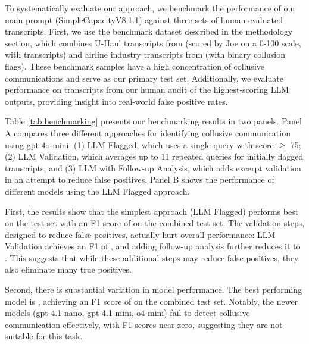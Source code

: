 To systematically evaluate our approach, we benchmark the performance of our main prompt (SimpleCapacityV8.1.1) against three sets of human-evaluated transcripts. First, we use the benchmark dataset described in the methodology section, which combines U-Haul transcripts from \textcite{harrington2022collusion} (scored by Joe on a 0-100 scale, with  transcripts) and airline industry transcripts from \textcite{aryal2022coordinated} (with  binary collusion flags). These benchmark samples have a high concentration of collusive communications and serve as our primary test set. Additionally, we evaluate performance on  transcripts from our human audit of the highest-scoring LLM outputs, providing insight into real-world false positive rates.

Table \ref{tab:benchmarking} presents our benchmarking results in two panels. Panel A compares three different approaches for identifying collusive communication using gpt-4o-mini: (1) LLM Flagged, which uses a single query with score $\geq$ 75; (2) LLM Validation, which averages up to 11 repeated queries for initially flagged transcripts; and (3) LLM with Follow-up Analysis, which adds excerpt validation in an attempt to reduce false positives. Panel B shows the performance of different models using the LLM Flagged approach.

First, the results show that the simplest approach (LLM Flagged) performs best on the test set with an F1 score of  on the combined test set. The validation steps, designed to reduce false positives, actually hurt overall performance: LLM Validation achieves an F1 of , and adding follow-up analysis further reduces it to . This suggests that while these additional steps may reduce false positives, they also eliminate many true positives.

Second, there is substantial variation in model performance. The best performing model is , achieving an F1 score of  on the combined test set. Notably, the newer models (gpt-4.1-nano, gpt-4.1-mini, o4-mini) fail to detect collusive communication effectively, with F1 scores near zero, suggesting they are not suitable for this task.

